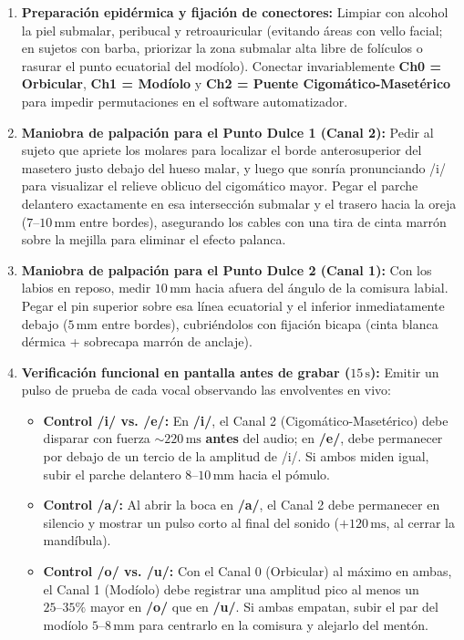 \documentclass[11pt,a4paper]{article}
\begin{document}
\begin{enumerate}
    \item \textbf{Preparación epidérmica y fijación de conectores:} Limpiar con alcohol la piel submalar, peribucal y retroauricular (evitando áreas con vello facial; en sujetos con barba, priorizar la zona submalar alta libre de folículos o rasurar el punto ecuatorial del modíolo). Conectar invariablemente \textbf{Ch0 = Orbicular}, \textbf{Ch1 = Modíolo} y \textbf{Ch2 = Puente Cigomático-Masetérico} para impedir permutaciones en el software automatizador.
    \item \textbf{Maniobra de palpación para el Punto Dulce 1 (Canal 2):} Pedir al sujeto que apriete los molares para localizar el borde anterosuperior del masetero justo debajo del hueso malar, y luego que sonría pronunciando /i/ para visualizar el relieve oblicuo del cigomático mayor. Pegar el parche delantero exactamente en esa intersección submalar y el trasero hacia la oreja ($7\text{--}10\,\text{mm}$ entre bordes), asegurando los cables con una tira de cinta marrón sobre la mejilla para eliminar el efecto palanca.
    \item \textbf{Maniobra de palpación para el Punto Dulce 2 (Canal 1):} Con los labios en reposo, medir $10\,\text{mm}$ hacia afuera del ángulo de la comisura labial. Pegar el pin superior sobre esa línea ecuatorial y el inferior inmediatamente debajo ($5\,\text{mm}$ entre bordes), cubriéndolos con fijación bicapa (cinta blanca dérmica + sobrecapa marrón de anclaje).
    \item \textbf{Verificación funcional en pantalla antes de grabar ($15\,\text{s}$):} Emitir un pulso de prueba de cada vocal observando las envolventes en vivo:
    \begin{itemize}
        \item \textbf{Control /i/ vs. /e/:} En \textbf{/i/}, el Canal 2 (Cigomático-Masetérico) debe disparar con fuerza $\sim 220\,\text{ms}$ \textbf{antes} del audio; en \textbf{/e/}, debe permanecer por debajo de un tercio de la amplitud de /i/. Si ambos miden igual, subir el parche delantero $8\text{--}10\,\text{mm}$ hacia el pómulo.
        \item \textbf{Control /a/:} Al abrir la boca en \textbf{/a/}, el Canal 2 debe permanecer en silencio y mostrar un pulso corto al final del sonido ($+120\,\text{ms}$, al cerrar la mandíbula).
        \item \textbf{Control /o/ vs. /u/:} Con el Canal 0 (Orbicular) al máximo en ambas, el Canal 1 (Modíolo) debe registrar una amplitud pico al menos un $25\text{--}35\%$ mayor en \textbf{/o/} que en \textbf{/u/}. Si ambas empatan, subir el par del modíolo $5\text{--}8\,\text{mm}$ para centrarlo en la comisura y alejarlo del mentón.
    \end{itemize}
\end{enumerate}
\end{document}
